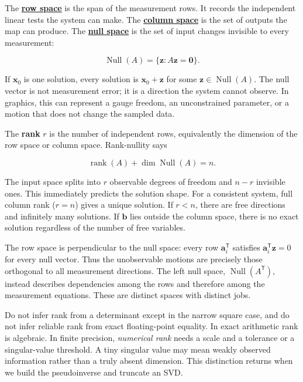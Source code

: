 The \textbf{\hyperref[01-foundations-i-ch019-a-system-is-an-intersection-of-constraints]{row space}} is the span of the measurement rows. It records the independent linear tests the system can make. The \textbf{\hyperref[01-foundations-i-ch019-a-system-is-an-intersection-of-constraints]{column space}} is the set of outputs the map can produce. The \textbf{\hyperref[01-foundations-i-ch019-a-system-is-an-intersection-of-constraints]{null space}} is the set of input changes invisible to every measurement:

\[
\operatorname{Null}(A)=\{\mathbf z:A\mathbf z=\mathbf0\}.
\]

If \(\mathbf x_0\) is one solution, every solution is \(\mathbf x_0+\mathbf z\) for some \(\mathbf z\in\operatorname{Null}(A)\). The null vector is not measurement error; it is a direction the system cannot observe. In graphics, this can represent a gauge freedom, an unconstrained parameter, or a motion that does not change the sampled data.

The \textbf{rank} \(r\) is the number of independent rows, equivalently the dimension of the row space or column space. Rank-nullity says

\[
\operatorname{rank}(A)+\dim\operatorname{Null}(A)=n.
\]

The input space splits into \(r\) observable degrees of freedom and \(n-r\) invisible ones. This immediately predicts the solution shape. For a consistent system, full column rank (\(r=n\)) gives a unique solution. If \(r<n\), there are free directions and infinitely many solutions. If \(\mathbf b\) lies outside the column space, there is no exact solution regardless of the number of free variables.

The row space is perpendicular to the null space: every row \(\mathbf a_i^\mathsf T\) satisfies \(\mathbf a_i^\mathsf T\mathbf z=0\) for every null vector. Thus the unobservable motions are precisely those orthogonal to all measurement directions. The left null space, \(\operatorname{Null}(A^\mathsf T)\), instead describes dependencies among the rows and therefore among the measurement equations. These are distinct spaces with distinct jobs.

Do not infer rank from a determinant except in the narrow square case, and do not infer reliable rank from exact floating-point equality. In exact arithmetic rank is algebraic. In finite precision, \emph{numerical rank} needs a scale and a tolerance or a singular-value threshold. A tiny singular value may mean weakly observed information rather than a truly absent dimension. This distinction returns when we build the pseudoinverse and truncate an SVD.

